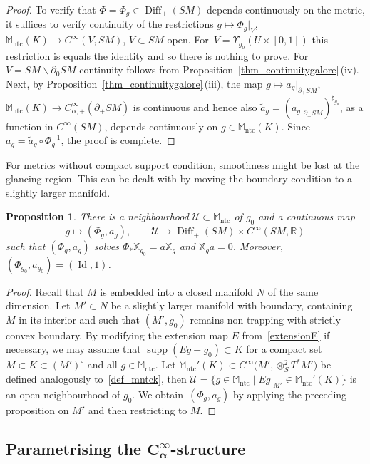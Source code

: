 \documentclass[10pt,a4paper]{amsart}
\numberwithin{equation}{section}
\newtheorem{Proposition}[Theorem]{Proposition}
\theoremstyle{definition}
\newcommand{\R}{\mathbb{R}} %
\newcommand{\M}{\mathbb{M}}
\newcommand{\1}{{\bf 1}}
\DeclareMathOperator{\supp}{supp}
\newcommand{\Id}{\operatorname{Id}}
\newcommand{\ntc}{\mathrm{ntc}}
\DeclareMathOperator{\Diff}{Diff}
\begin{document}
\begin{proof}
To verify that $\Phi=\Phi_g\in \Diff_+(SM)$ depends continuously on the metric, it suffices to verify continuity of the restrictions
$g\mapsto \Phi_g\vert_{V}$, $ \M_\ntc(K)\rightarrow C^\infty(V,SM)$, $ V\subset SM$ open.
For~${V=\Upsilon_{g_0}(U\times [0,1])}$ this restriction is equals the identity and so there is nothing to prove. For $V=SM\backslash \partial_0 SM$ continuity follows from Proposition~\ref{thm_continuitygalore}\,(iv). Next, by Proposition~\ref{thm_continuitygalore}\,(iii), the map
$g\mapsto a_g\vert_{\partial_+SM}$, $ \M_\ntc(K)\rightarrow C_{\alpha,+}^\infty(\partial_+SM)
$
is continuous and hence also $\tilde a_g = (a_g\vert_{\partial_+SM})^{\sharp_{g_0}}$, as a function in $C^\infty(SM)$, depends continuously on $g\in \M_\ntc(K)$. Since $a_{g}=\tilde a_g\circ \Phi_g^{-1}$, the proof is complete.
\end{proof}


For metrics without compact support condition, smoothness might be lost at the glancing region. This can be dealt with by moving the boundary condition to a slightly larger manifold.

\begin{Proposition}\label{prop_conjugacy2}
	There is a neighbourhood $\mathcal U\subset \M_\ntc$ of $g_0$ and a continuous map
	\[
		g\mapsto (\Phi_g,a_g),\qquad \mathcal U\rightarrow \Diff_+(SM)\times C^\infty(SM,\R)
	\]
	such that $(\Phi_g,a_g)$ solves $\Phi_*\mathbb X_{g_0}=a \mathbb X_g$ and $\mathbb X_{g}a =0$. Moreover, $(\Phi_{g_0},a_{g_0})=(\Id,1)$.
\end{Proposition}

\begin{proof}
	Recall that $M$ is embedded into a closed manifold $N$ of the same dimension. Let $M'\subset N$ be a slightly larger manifold with boundary, containing $M$ in its interior and such that $(M',g_0)$ remains non-trapping with strictly convex boundary. By modifying the extension map $E$ from~\eqref{extensionE} if necessary, we may assume that $\supp(Eg - g_0)\subset K$ for a compact set~${M\subset K \subset ( M')^\circ}$ and all $g\in \M_\ntc$. Let $\M_\ntc'(K)\subset C^\infty\bigl(M',\otimes^2_ST^*M'\bigr)$ be defined analogously to~\eqref{def_mntck}, then
	$
		\mathcal U = \{g\in \M_\ntc\mid Eg\vert_{M'} \in \M_\ntc'(K)\}
	$
	is an open neighbourhood of $g_0$. We obtain~$(\Phi_g,a_g)$ by applying the preceding proposition on $M'$ and then restricting to $M$.
\end{proof}

\subsection[Parametrising the C\_alpha\^{}infty-structure]{Parametrising the $\boldsymbol{C_\alpha^\infty}$-structure}\label{s_refG}
\end{document}
